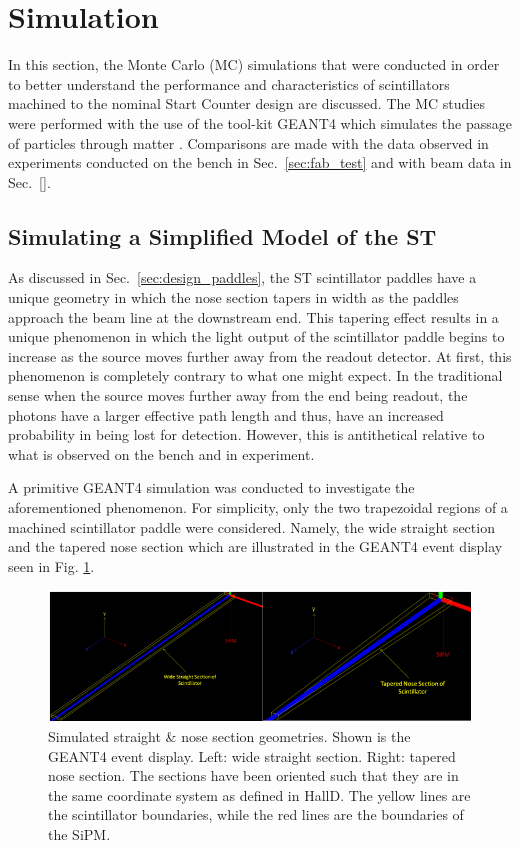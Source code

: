 \section{Simulation} \label{sec:sim}

In this section, the Monte Carlo (MC) simulations that were conducted in order to better understand the performance and characteristics of scintillators machined to the nominal \gx{} Start Counter design are discussed.  The MC studies were performed with the use of the tool-kit GEANT4 which simulates the passage of particles through matter \cite{geant4_website}.  Comparisons are made with the data observed in experiments conducted on the bench in Sec.~\ref{sec:fab_test} and with beam data in Sec.~\ref{}.  

\subsection{Simulating a Simplified Model of the ST} \label{sec:sim_simple}

As discussed in Sec.~\ref{sec:design_paddles}, the ST scintillator paddles have a unique geometry in which the nose section tapers in width as the paddles approach the beam line at the downstream end.  This tapering effect results in a unique phenomenon in which the light output of the scintillator paddle begins to increase as the source moves further away from the readout detector.  At first, this phenomenon is completely contrary to what one might expect. In the traditional sense when the source moves further away from the end being readout, the photons have a larger effective path length and thus, have an increased probability in being lost for detection.  However, this is antithetical relative to what is observed on the bench and in experiment.

A primitive GEANT4 simulation was conducted to investigate the aforementioned phenomenon. For simplicity, only the two trapezoidal regions of a machined scintillator paddle were considered.  Namely, the wide straight section and the tapered nose section which are illustrated in the GEANT4 event display  seen in Fig. \ref{fig:beam_off}.
	\begin{figure}[!htb]
	\centering
	\includegraphics[width=1.0\columnwidth]{simulation/figs/beam_off}
	\caption{Simulated straight \& nose section geometries.  Shown is the GEANT4 event display.  Left: wide straight section.  Right: tapered nose section.  The sections have been oriented such that they are in the same coordinate system as defined in HallD.  The yellow lines are the scintillator boundaries, while the red lines are the boundaries of the SiPM.}
	\label{fig:beam_off}
	\end{figure}  

